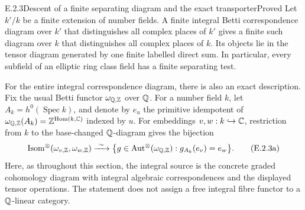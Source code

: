 \begin{result}{E.2.3}{Descent of a finite separating diagram and the exact transporter}{Proved}
Let $k'/k$ be a finite extension of number fields. A finite integral Betti correspondence diagram over $k'$ that distinguishes all complex places of $k'$ gives a finite such diagram over $k$ that distinguishes all complex places of $k$. Its objects lie in the tensor diagram generated by one finite labelled direct sum. In particular, every subfield of an elliptic ring class field has a finite separating test.

For the entire integral correspondence diagram, there is also an exact description. Fix the usual Betti functor $\omega_{\mathbb Q,\mathbb Z}$ over $\mathbb Q$. For a number field $k$, let $A_k=h^0(\operatorname{Spec}k)$, and denote by $e_u$ the primitive idempotent of $\omega_{\mathbb Q,\mathbb Z}(A_k)=\mathbb Z^{\operatorname{Hom}(k,\mathbb C)}$ indexed by $u$. For embeddings $v,w:k\hookrightarrow\mathbb C$, restriction from $k$ to the base-changed $\mathbb Q$-diagram gives the bijection
\[
 \operatorname{Isom}^\otimes(\omega_{v,\mathbb Z},\omega_{w,\mathbb Z})
 \xrightarrow{\ \sim\ }
 \bigl\{g\in\operatorname{Aut}^\otimes(\omega_{\mathbb Q,\mathbb Z}):
                  g_{A_k}(e_v)=e_w\bigr\}.
 \tag{E.2.3a}
\]
Here, as throughout this section, the integral source is the concrete graded cohomology diagram with integral algebraic correspondences and the displayed tensor operations. The statement does not assign a free integral fibre functor to a $\mathbb Q$-linear category.
\end{result}
